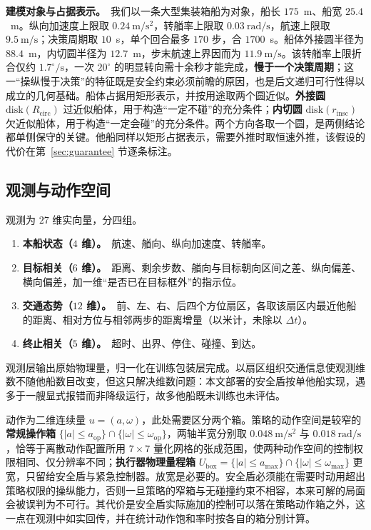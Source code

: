 \documentclass[12pt,letterpaper]{article}
\begin{document}
\textbf{建模对象与占据表示。}\ 我们以一条大型集装箱船为对象，船长 $175$~m、船宽 $25.4$~m。纵向加速度上限取 $0.24~\mathrm{m/s^2}$，转艏率上限取 $0.03~\mathrm{rad/s}$，航速上限取 $9.5~\mathrm{m/s}$；决策周期取 $10$~s，单个回合最多 $170$ 步，合 $1700$~s。船体外接圆半径为 $88.4$~m，内切圆半径为 $12.7$~m，步末航速上界因而为 $11.9~\mathrm{m/s}$。该转艏率上限折合仅约 $1.7^\circ/\mathrm{s}$，一次 $20^\circ$ 的明显转向需十余秒才能完成，\textbf{慢于一个决策周期}；这一“操纵慢于决策”的特征既是安全约束必须前瞻的原因，也是后文递归可行性得以成立的几何基础。船体占据用矩形表示，并按用途取两个圆近似。\textbf{外接圆} $\mathrm{disk}(R_{\mathrm{circ}})$ 过近似船体，用于构造“一定不碰”的充分条件；\textbf{内切圆} $\mathrm{disk}(r_{\mathrm{insc}})$ 欠近似船体，用于构造“一定会碰”的充分条件。两个方向各取一个圆，是两侧结论都单侧保守的关键。他船同样以矩形占据表示，需要外推时取恒速外推，该假设的代价在第~\ref{sec:guarantee} 节逐条标注。


\subsection{观测与动作空间}
\label{sec:obsact}

观测为 $27$ 维实向量，分四组。
\begin{enumerate}\itemsep1pt\parskip0pt
 \item \textbf{本船状态（$4$ 维）。}\ 航速、艏向、纵向加速度、转艏率。
 \item \textbf{目标相关（$6$ 维）。}\ 距离、剩余步数、艏向与目标朝向区间之差、纵向偏差、横向偏差，加一维“是否已在目标框外”的指示位。
 \item \textbf{交通态势（$12$ 维）。}\ 前、左、右、后四个方位扇区，各取该扇区内最近他船的距离、相对方位与相邻两步的距离增量（以米计，未除以 $\Delta t$）。
 \item \textbf{终止相关（$5$ 维）。}\ 超时、出界、停住、碰撞、到达。
\end{enumerate}
观测层输出原始物理量，归一化在训练包装层完成。以扇区组织交通信息使观测维数不随他船数目改变，但这只解决维数问题：本文部署的安全盾按单他船实现，遇多于一艘显式报错而非降级运行，故多他船既未训练也未评估。


动作为二维连续量 $u=(a,\omega)$，此处需要区分两个箱。策略的动作空间是较窄的\textbf{常规操作箱} $\{|a|\le a_{\mathrm{op}}\}\cap\{|\omega|\le\omega_{\mathrm{op}}\}$，两轴半宽分别取 $0.048~\mathrm{m/s^2}$ 与 $0.018~\mathrm{rad/s}$，恰等于离散动作配置所用 $7\times7$ 量化网格的张成范围，使两种动作空间的控制权限相同、仅分辨率不同；\textbf{执行器物理量程箱} $U_{\mathrm{box}}=\{|a|\le a_{\max}\}\cap\{|\omega|\le\omega_{\max}\}$ 更宽，只留给安全盾与紧急控制器。放宽是必要的。安全盾必须能在需要时动用超出策略权限的操纵能力，否则一旦策略的窄箱与无碰撞约束不相容，本来可解的局面会被误判为不可行。其代价是安全盾实际施加的控制可以落在策略动作箱之外，这一点在观测中如实回传，并在统计动作饱和率时按各自的箱分别计算。
\end{document}
